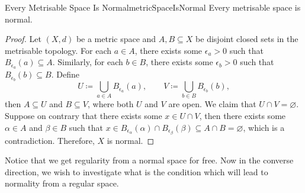 \documentclass[math]{amznotes}
\theoremstyle{remark}
\begin{document}
\begin{probox}{Every Metrisable Space Is Normal}{metricSpaceIsNormal}
    Every metrisable space is normal.
    \tcblower
    \begin{proof}
        Let $\left(X, d\right)$ be a metric space and $A, B \subseteq X$ be disjoint closed sets in the metrisable topology. For each $a \in A$, there exists some $\epsilon_a > 0$ such that $B_{\epsilon_a}\left(a\right) \subseteq A$. Similarly, for each $b \in B$, there exists some $\epsilon_b > 0$ such that $B_{\epsilon_b}\left(b\right) \subseteq B$. Define 
        \begin{equation*}
            U \coloneqq \bigcup_{a \in A}B_{\epsilon_a}\left(a\right), \qquad V \coloneqq \bigcup_{b \in B}B_{\epsilon_b}\left(b\right),
        \end{equation*}
        then $A \subseteq U$ and $B \subseteq V$, where both $U$ and $V$ are open. We claim that $U \cap V = \varnothing$. Suppose on contrary that there exists some $x \in U \cap V$, then there exists some $\alpha \in A$ and $\beta \in B$ such that $x \in B_{\epsilon_{\alpha}}\left(\alpha\right) \cap B_{\epsilon_{\beta}}\left(\beta\right) \subseteq A \cap B = \varnothing$, which is a contradiction. Therefore, $X$ is normal.
    \end{proof}
\end{probox}
Notice that we get regularity from a normal space for free. Now in the converse direction, we wish to investigate what is the condition which will lead to normality from a regular space.
\end{document}
